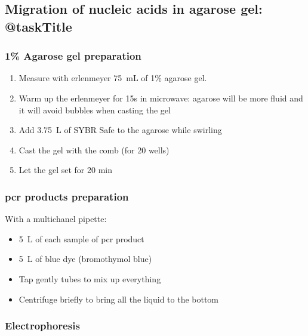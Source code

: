 \subsection{Migration of nucleic acids in agarose gel: @taskTitle}
\label{task:@label}

\subsubsection{1\% Agarose gel preparation}

\begin{enumerate}
\item Measure with erlenmeyer 75~mL of 1\% agarose gel.
\item Warm up the erlenmeyer for 15s in microwave: agarose will be more fluid and it will avoid bubbles when casting the gel
\item Add 3.75~\textmu L of SYBR Safe to the agarose while swirling 
\item Cast the gel with the comb (for 20 wells)
\item Let the gel set for 20 min
\end{enumerate}


\subsubsection{\gls{pcr} products preparation}

With a multichanel pipette:
\begin{itemize}
\item 5~\textmu L of each sample of \gls{pcr} product
\item 5~\textmu L of blue dye (bromothymol blue)
\item Tap gently tubes to mix up everything
\item Centrifuge briefly to bring all the liquid to the bottom
\end{itemize}

\subsubsection{Electrophoresis}

